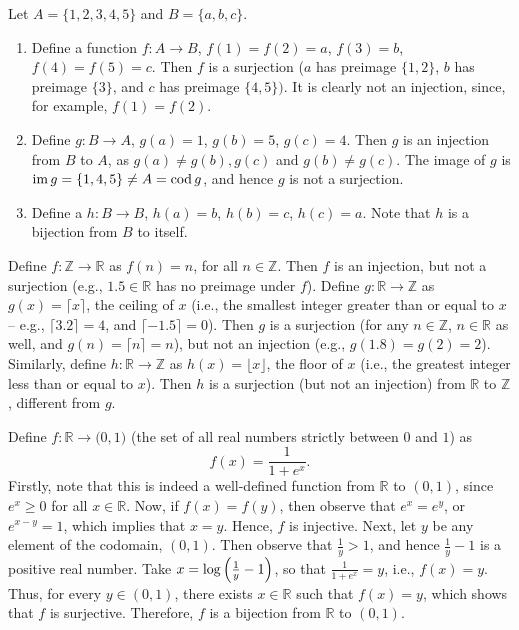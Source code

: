 \begin{Example}
Let $A = \{1, 2, 3, 4, 5\}$ and $B = \{a, b, c\}$.
\begin{enumerate}
\item Define a function $f \colon A \to B$, $f(1) = f(2) = a$, $f(3) = b$, $f(4) = f(5) = c$. Then $f$ is a surjection ($a$ has preimage $\{1, 2\}$, $b$ has preimage $\{3\}$, and $c$ has preimage $\{4, 5\})$. It is clearly not an injection, since, for example, $f(1) = f(2)$.

\item Define $g \colon B \to A$, $g(a) = 1$, $g(b) = 5$, $g(c) = 4$. Then $g$ is an injection from $B$ to $A$, as $g(a) \ne g(b), g(c)$ and $g(b) \ne g(c)$. The image of $g$ is $\operatorname{im} g = \{1, 4, 5\} \ne A = \operatorname{cod} g$, and hence $g$ is not a surjection.

\item Define a $h \colon B \to B$, $h(a) = b$, $h(b) = c$, $h(c) = a$. Note that $h$ is a bijection from $B$ to itself.
\end{enumerate}
\end{Example}

\begin{Example}
Define $f \colon \mathbb Z \to \mathbb R$ as $f(n) = n$, for all $n \in \mathbb Z$. Then $f$ is an injection, but not a surjection (e.g., $1.5 \in \mathbb R$ has no preimage under $f$). Define $g \colon \mathbb R \to \mathbb Z$ as $g(x) = \lceil x \rceil$, the ceiling of $x$ (i.e., the smallest integer greater than or equal to $x$ -- e.g., $\lceil 3.2 \rceil = 4$, and $\lceil -1.5 \rceil = 0$). Then $g$ is a surjection (for any $n \in \mathbb Z$, $n \in \mathbb R$ as well, and $g(n) = \lceil n \rceil = n$), but not an injection (e.g., $g(1.8) = g(2) = 2$). Similarly, define $h \colon \mathbb R \to \mathbb Z$ as $h(x) = \lfloor x \rfloor$, the floor of $x$ (i.e., the greatest integer less than or equal to $x$). Then $h$ is a surjection (but not an injection) from $\mathbb R$ to $\mathbb Z$, different from $g$.
\end{Example}

\begin{Example}
Define $f \colon \mathbb R \to \mathbb (0,1)$ (the set of all real numbers strictly between $0$ and $1$) as
\begin{equation*}
f(x) = \dfrac{1}{1 + e^x}.
\end{equation*}
Firstly, note that this is indeed a well-defined function from $\mathbb R$ to $(0, 1)$, since $e^x \ge 0$ for all $x \in \mathbb R$. Now, if $f(x) = f(y)$, then observe that $e^x = e^y$, or $e^{x - y} = 1$, which implies that $x = y$. Hence, $f$ is injective. Next, let $y$ be any element of the codomain, $(0, 1)$. Then observe that $\frac 1 y > 1$, and hence $\frac 1 y - 1$ is a positive real number. Take $x = \log\pqty{\frac 1 y - 1}$, so that $\frac 1 {1 + e^x} = y$, i.e., $f(x) = y$. Thus, for every $y \in (0, 1)$, there exists $x \in \mathbb R$ such that $f(x) = y$, which shows that $f$ is surjective. Therefore, $f$ is a bijection from $\mathbb R$ to $(0, 1)$.
\end{Example}

